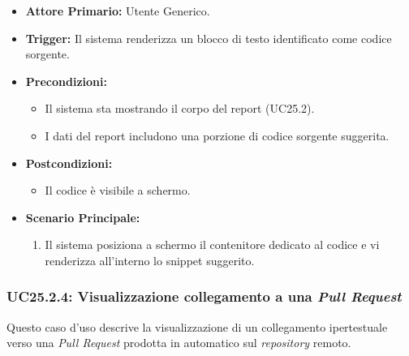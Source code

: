 \documentclass[12pt, a4paper]{article}
\begin{document}
\begin{itemize}
    \item \textbf{Attore Primario:} Utente Generico.
    \item \textbf{Trigger:} Il sistema renderizza un blocco di testo identificato come codice sorgente.
    \item \textbf{Precondizioni:}
    \begin{itemize}
        \item Il sistema sta mostrando il corpo del report (UC25.2).
        \item I dati del report includono una porzione di codice sorgente suggerita.
    \end{itemize}
    \item \textbf{Postcondizioni:}
    \begin{itemize}
        \item Il codice è visibile a schermo.
    \end{itemize}
    \item \textbf{Scenario Principale:}
    \begin{enumerate}
        \item Il sistema posiziona a schermo il contenitore dedicato al codice e vi renderizza all'interno lo snippet suggerito.
    \end{enumerate}
\end{itemize}

\subsubsection{UC25.2.4: Visualizzazione collegamento a una \textit{Pull Request}}\label{uc:25.2.4}
Questo caso d'uso descrive la visualizzazione di un collegamento ipertestuale verso una \textit{Pull Request} prodotta in automatico sul \textit{repository} remoto.
\end{document}
